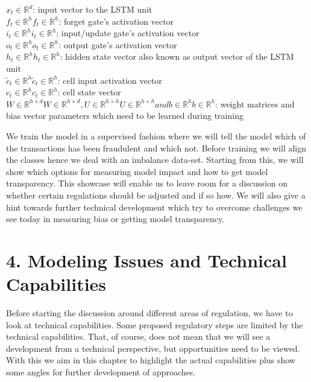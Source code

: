 \documentclass[jou,apacite]{apa6}
\begin{document}
${\displaystyle x_{t}\in \mathbb {R} ^{d}}$: input vector to the LSTM unit \\
${\displaystyle f_{t}\in \mathbb {R} ^{h}} {\displaystyle f_{t}\in \mathbb {R} ^{h}}$: forget gate's activation vector \\
${\displaystyle i_{t}\in \mathbb {R} ^{h}} {\displaystyle i_{t}\in \mathbb {R} ^{h}}$: input/update gate's activation vector \\
${\displaystyle o_{t}\in \mathbb {R} ^{h}} {\displaystyle o_{t}\in \mathbb {R} ^{h}}$: output gate's activation vector \\
${\displaystyle h_{t}\in \mathbb {R} ^{h}} {\displaystyle h_{t}\in \mathbb {R} ^{h}}$: hidden state vector also known as output vector of the LSTM unit \\
${\displaystyle {\tilde {c}}_{t}\in \mathbb {R} ^{h}} {\displaystyle {\tilde {c}}_{t}\in \mathbb {R} ^{h}}$: cell input activation vector \\
${\displaystyle c_{t}\in \mathbb {R} ^{h}} {\displaystyle c_{t}\in \mathbb {R} ^{h}}$: cell state vector \\
${\displaystyle W\in \mathbb {R} ^{h\times d}} {\displaystyle W\in \mathbb {R} ^{h\times d}}, {\displaystyle U\in \mathbb {R} ^{h\times h}} {\displaystyle U\in \mathbb {R} ^{h\times h}} and {\displaystyle b\in \mathbb {R} ^{h}} {\displaystyle b\in \mathbb {R} ^{h}}$: weight matrices and bias vector parameters which need to be learned during training \par

We train the model in a supervised fashion where we will tell the model which of the transactions has been fraudulent and which not. Before training we will align the classes hence we deal with an imbalance data-set. Starting from this, we will show which options for measuring model impact and how to get model transparency. This showcase will enable us to leave room for a discussion on whether certain regulations should be adjusted and if so how. We will also give a hint towards further technical development which try to overcome challenges we see today in measuring bias or getting model transparency.

\section{4. Modeling Issues and Technical Capabilities}

Before starting the discussion around different areas of regulation, we have to look at technical capabilities. Some proposed regulatory steps are limited by the technical capabilities. That, of course, does not mean that we will see a development from a technical perspective, but opportunities need to be viewed. With this we aim in this chapter to highlight the actual capabilities plus show some angles for further development of approaches.\par
\end{document}
